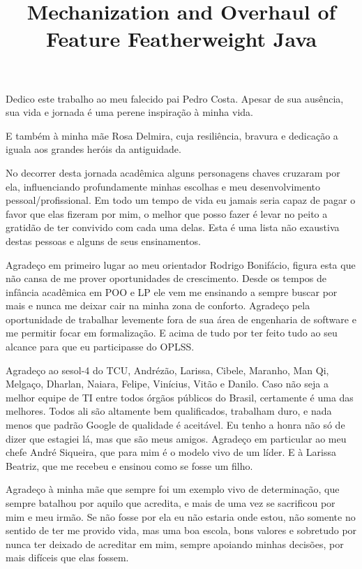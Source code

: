 \documentclass[bacharelado]{unb-cic}
\title{Mechanization and Overhaul of Feature Featherweight Java}
\theoremstyle{definition}
\theoremstyle{definition}
\begin{document}
  \maketitle
  \pretextual

  \begin{dedicatoria}
      Dedico este trabalho ao meu falecido pai Pedro Costa.
      Apesar de sua ausência, sua vida e jornada é uma perene inspiração
      à minha vida.

      E também à minha mãe Rosa Delmira, cuja resiliência,
      bravura e dedicação a iguala aos grandes heróis da antiguidade.
  \end{dedicatoria}

  \begin{agradecimentos}
      No decorrer desta jornada acadêmica alguns personagens chaves cruzaram por ela,
      influenciando profundamente minhas escolhas e meu desenvolvimento pessoal/profissional. Em todo um tempo de vida eu jamais seria capaz de pagar o favor
      que elas fizeram por mim, o melhor que posso fazer é levar no peito a gratidão
      de ter convivido com cada uma delas. Esta é uma lista não exaustiva destas pessoas e alguns de seus ensinamentos.

      Agradeço em primeiro lugar ao meu orientador Rodrigo Bonifácio, figura esta que 
      não cansa de me prover oportunidades de crescimento. Desde os tempos de infância
      acadêmica em POO e LP ele vem me ensinando a sempre buscar por mais e nunca 
      me deixar cair na minha zona de conforto. Agradeço pela oportunidade de trabalhar
      levemente fora de sua área de engenharia de software e me permitir focar em formalização. E acima de tudo por ter feito tudo ao seu alcance para que eu participasse do OPLSS.

      Agradeço ao sesol-4 do TCU, Andrézão, Larissa, Cibele, Maranho, Man Qi, Melgaço,
      Dharlan, Naiara, Felipe, Vinícius, Vitão e Danilo.
      Caso não seja a melhor equipe de TI entre todos órgãos públicos do Brasil,
      certamente é uma das melhores. Todos ali são altamente bem qualificados,
      trabalham duro, e nada menos que padrão Google de qualidade é aceitável.
      Eu tenho a honra não só de dizer que estagiei lá, mas que são meus amigos.
      Agradeço em particular ao meu chefe André Siqueira, que para mim é o modelo vivo de um líder.
      E à Larissa Beatriz, que me recebeu e ensinou como se fosse um filho.

      Agradeço à minha mãe que sempre foi um exemplo vivo de determinação,
      que sempre batalhou por aquilo que acredita, e mais de uma vez se sacrificou
      por mim e meu irmão. Se não fosse por ela eu não estaria onde estou, não somente
      no sentido de ter me provido vida, mas uma boa escola, bons valores e sobretudo
      por nunca ter deixado de acreditar em mim, sempre apoiando minhas decisões, por
      mais difíceis que elas fossem.


\end{agradecimentos}
\end{document}
